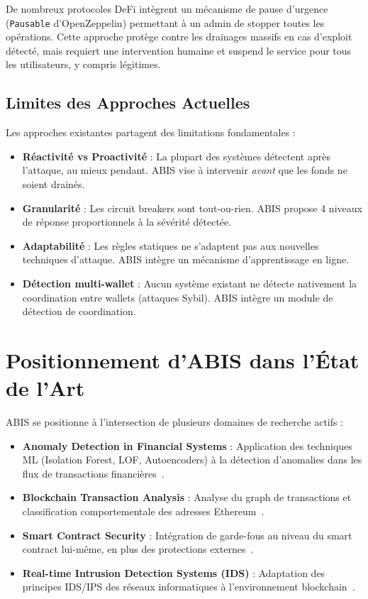 \documentclass[12pt,a4paper]{report}
\newcommand{\code}[1]{\texttt{#1}}
\begin{document}
De nombreux protocoles DeFi intègrent un mécanisme de pause d'urgence (\code{Pausable} d'OpenZeppelin) permettant à un admin de stopper toutes les opérations. Cette approche protège contre les drainages massifs en cas d'exploit détecté, mais requiert une intervention humaine et suspend le service pour tous les utilisateurs, y compris légitimes.

\subsection{Limites des Approches Actuelles}

Les approches existantes partagent des limitations fondamentales :

\begin{itemize}
  \item \textbf{Réactivité vs Proactivité} : La plupart des systèmes détectent après l'attaque, au mieux pendant. ABIS vise à intervenir \textit{avant} que les fonds ne soient drainés.
  \item \textbf{Granularité} : Les circuit breakers sont tout-ou-rien. ABIS propose 4 niveaux de réponse proportionnels à la sévérité détectée.
  \item \textbf{Adaptabilité} : Les règles statiques ne s'adaptent pas aux nouvelles techniques d'attaque. ABIS intègre un mécanisme d'apprentissage en ligne.
  \item \textbf{Détection multi-wallet} : Aucun système existant ne détecte nativement la coordination entre wallets (attaques Sybil). ABIS intègre un module de détection de coordination.
\end{itemize}

\section{Positionnement d'ABIS dans l'État de l'Art}

ABIS se positionne à l'intersection de plusieurs domaines de recherche actifs :

\begin{itemize}
  \item \textbf{Anomaly Detection in Financial Systems} : Application des techniques ML (Isolation Forest, LOF, Autoencoders) à la détection d'anomalies dans les flux de transactions financières~\cite{ref_iforest}.
  \item \textbf{Blockchain Transaction Analysis} : Analyse du graph de transactions et classification comportementale des adresses Ethereum~\cite{ref_ethereum_analysis}.
  \item \textbf{Smart Contract Security} : Intégration de garde-fous au niveau du smart contract lui-même, en plus des protections externes~\cite{ref_smart_contract_security}.
  \item \textbf{Real-time Intrusion Detection Systems (IDS)} : Adaptation des principes IDS/IPS des réseaux informatiques à l'environnement blockchain~\cite{ref_ids_blockchain}.
\end{itemize}
\end{document}
